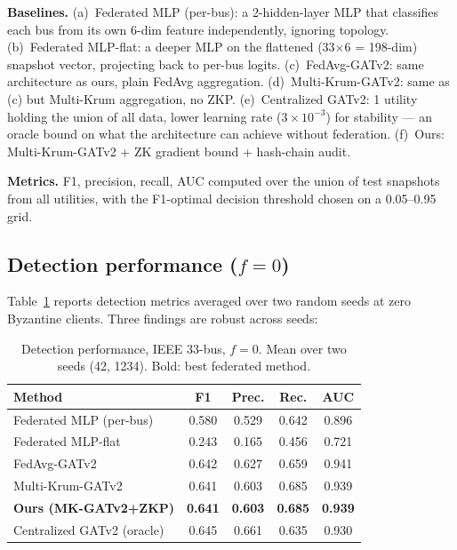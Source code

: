 \documentclass[conference]{IEEEtran}
\begin{document}
\textbf{Baselines.}
(a)~Federated MLP (per-bus): a 2-hidden-layer MLP that classifies each bus from its own 6-dim feature independently, ignoring topology.
(b)~Federated MLP-flat: a deeper MLP on the flattened (33$\times$6 = 198-dim) snapshot vector, projecting back to per-bus logits.
(c)~FedAvg-GATv2: same architecture as ours, plain FedAvg aggregation.
(d)~Multi-Krum-GATv2: same as (c) but Multi-Krum aggregation, no ZKP.
(e)~Centralized GATv2: 1 utility holding the union of all data, lower learning rate ($3\times10^{-3}$) for stability — an oracle bound on what the architecture can achieve without federation.
(f)~Ours: Multi-Krum-GATv2 + ZK gradient bound + hash-chain audit.

\textbf{Metrics.} F1, precision, recall, AUC computed over the union of test snapshots from all utilities, with the F1-optimal decision threshold chosen on a 0.05--0.95 grid.

\subsection{Detection performance ($f=0$)}
\label{sec:eval-perf}
Table~\ref{tab:perf} reports detection metrics averaged over two random seeds at zero Byzantine clients. Three findings are robust across seeds:

\begin{table}[t]
\centering
\caption{Detection performance, IEEE 33-bus, $f=0$. Mean over two seeds (42, 1234). Bold: best federated method.}
\label{tab:perf}
\renewcommand{\arraystretch}{1.05}
\begin{tabular}{lcccc}
\toprule
\textbf{Method} & \textbf{F1} & \textbf{Prec.} & \textbf{Rec.} & \textbf{AUC} \\
\midrule
Federated MLP (per-bus)        & 0.580 & 0.529 & 0.642 & 0.896 \\
Federated MLP-flat              & 0.243 & 0.165 & 0.456 & 0.721 \\
FedAvg-GATv2                    & 0.642 & 0.627 & 0.659 & 0.941 \\
Multi-Krum-GATv2                & 0.641 & 0.603 & 0.685 & 0.939 \\
\textbf{Ours (MK-GATv2+ZKP)}    & \textbf{0.641} & \textbf{0.603} & \textbf{0.685} & \textbf{0.939} \\
\midrule
Centralized GATv2 (oracle)      & 0.645 & 0.661 & 0.635 & 0.930 \\
\bottomrule
\end{tabular}
\end{table}
\end{document}
